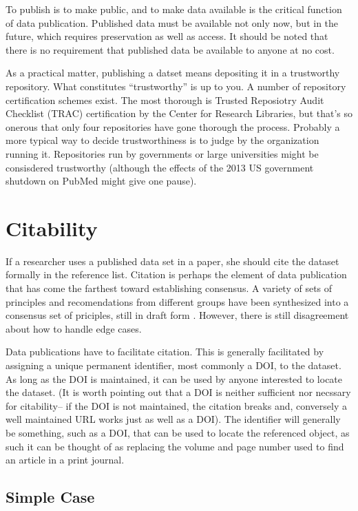 \documentclass[10pt,a4paper,twocolumn]{article}
\begin{document}
To publish is to make public, and to make data available is the critical function of data publication. 
Published data must be available not only now, but in the future, which requires preservation as well as access. 
It should be noted that there is no requirement that published data be available to anyone at no cost.

As a practical matter, publishing a datset means depositing it in a trustworthy repository. 
What constitutes ``trustworthy'' is up to you. 
A number of repository certification schemes exist. The most thorough is Trusted Reposiotry Audit Checklist (TRAC)\cite{trac_2007} certification by the Center for Research Libraries, but that's so onerous that only four repositories have gone thorough the process. 
Probably a more typical way to decide trustworthiness is to judge by the organization running it. 
Repositories run by governments or large universities might be consisdered trustworthy (although the effects of the 2013 US government shutdown on PubMed might give one pause).

\section*{Citability}\label{citability}

If a researcher uses a published data set in a paper, she should cite the dataset formally in the reference list. 
Citation is perhaps the element of data publication that has come the farthest toward establishing consensus.
A variety of sets of principles and recomendations from different groups have been synthesized into a consensus set of priciples, still in draft form \cite{force11_data_2013}. 
However, there is still disagreement about how to handle edge cases.

Data publications have to facilitate citation. 
This is generally facilitated by assigning a unique permanent identifier, most commonly a DOI, to the dataset. 
As long as the DOI is maintained, it can be used by anyone interested to locate the dataset. 
(It is worth pointing out that a DOI is neither sufficient nor necssary for citability-- if the DOI is not maintained, the citation breaks and, conversely a well maintained URL works just as well as a DOI). 
The identifier will generally be something, such as a DOI, that can be used to locate the referenced object, as such it can be thought of as replacing the volume and page number used to find an article in a print journal.

\subsection*{Simple Case}\label{simple-case}
\end{document}
